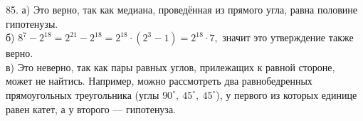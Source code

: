 85. а) Это верно, так как медиана, проведённая из прямого угла, равна половине гипотенузы.\\
б) $8^7-2^{18}=2^{21}-2^{18}=2^{18}\cdot(2^3-1)=2^{18}\cdot7,$ значит это утверждение также верно.\\
в) Это неверно, так как пары равных углов, прилежащих к равной стороне, может не найтись. Например, можно рассмотреть два равнобедренных прямоугольных треугольника (углы $90^\circ,\ 45^\circ,\ 45^\circ$), у первого из которых единице равен катет, а у второго --- гипотенуза.\\
